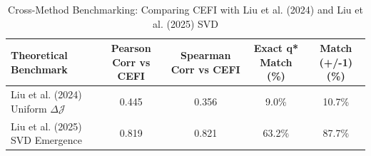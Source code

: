 \begin{table}
\caption{Cross-Method Benchmarking: Comparing CEFI with Liu et al. (2024) and Liu et al. (2025) SVD}
\label{tab:cross_framework}
\begin{tabular}{lcccc}
	\toprule
Theoretical Benchmark & Pearson Corr vs CEFI & Spearman Corr vs CEFI & Exact q* Match (\%) & Match (+/-1) (\%) \\
\midrule
Liu et al. (2024) Uniform $\Delta \mathcal{J}$ & 0.445 & 0.356 & 9.0\% & 10.7\% \\
Liu et al. (2025) SVD Emergence & 0.819 & 0.821 & 63.2\% & 87.7\% \\
\bottomrule
\end{tabular}
\end{table}
